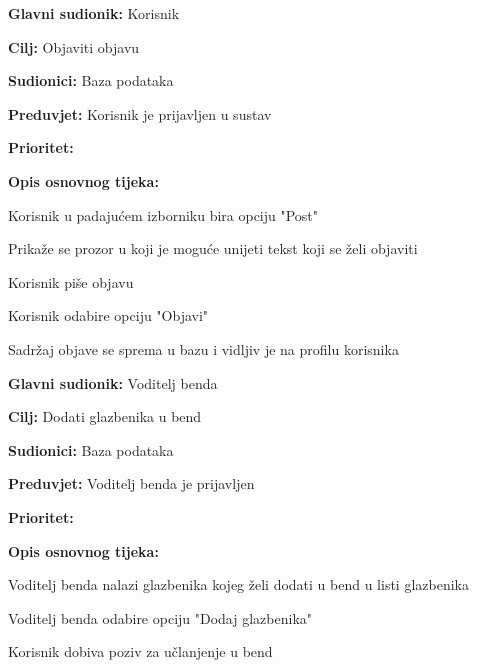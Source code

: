 \noindent {}
	\begin{packed_item}
		
		\item \textbf{Glavni sudionik: } Korisnik
		\item  \textbf{Cilj:} Objaviti objavu
		\item  \textbf{Sudionici:} Baza podataka
		\item  \textbf{Preduvjet:} Korisnik je prijavljen u sustav
		\item  \textbf{Prioritet:} 
		\item  \textbf{Opis osnovnog tijeka:}
		
		\item[] \begin{packed_enum}
			
			\item Korisnik u padajućem izborniku bira opciju "Post"
			\item Prikaže se prozor u koji je moguće unijeti tekst koji se želi objaviti 
			\item Korisnik piše objavu
			\item Korisnik odabire opciju "Objavi"
			\item Sadržaj objave se sprema u bazu i vidljiv je na profilu korisnika
		\end{packed_enum}
	\end{packed_item}

\noindent {}
	\begin{packed_item}
		
		\item \textbf{Glavni sudionik: } Voditelj benda
		\item \textbf{Cilj:} Dodati glazbenika u bend
		\item \textbf{Sudionici:} Baza podataka
		\item \textbf{Preduvjet:} Voditelj benda je prijavljen 
		\item \textbf{Prioritet:} 
		\item \textbf{Opis osnovnog tijeka:} 
		
		\item[] \begin{packed_enum}
			\item Voditelj benda nalazi glazbenika kojeg želi dodati u bend u listi glazbenika
			\item Voditelj benda odabire opciju "Dodaj glazbenika" 
			\item Korisnik dobiva poziv za učlanjenje u bend
		\end{packed_enum}
		
	\end{packed_item}	

